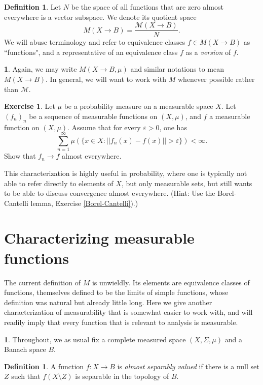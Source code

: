 \documentclass[12pt]{book}
\newcommand{\dfn}[1]{\emph{#1}\index{#1}}
\theoremstyle{definition}
\newtheorem{subsec}[theorem]{}
\newtheorem{definition}[theorem]{Definition}
\newtheorem{exercise}[theorem]{Exercise}
\begin{document}
\begin{definition}
Let $N$ be the space of all functions that are zero almost everywhere is a vector subspace. We denote its quotient space
$$M(X \to B) = \frac{\mathcal M(X \to B)}{N}.$$
We will abuse terminology and refer to equivalence classes $f \in M(X \to B)$ as ``functions", and a representative of an equivalence class $f$ as a \dfn{version} of $f$.
\end{definition}

\begin{subsec}
Again, we may write $M(X \to B, \mu)$ and similar notations to mean $M(X \to B)$.
In general, we will want to work with $M$ whenever possible rather than $\mathcal M$.
\end{subsec}

\begin{exercise}
Let $\mu$ be a probability measure on a measurable space $X$.
Let $(f_n)_n$ be a sequence of measurable functions on $(X, \mu)$, and $f$ a measurable function on $(X, \mu)$.
Assume that for every $\varepsilon > 0$, one has
$$\sum_{n=1}^\infty \mu(\{x \in X: ||f_n(x) - f(x)|| > \varepsilon\}) < \infty.$$
Show that $f_n \to f$ almost everywhere.

This characterization is highly useful in probability, where one is typically not able to refer directly to elements of $X$, but only measurable sets, but still wants to be able to discuss convergence almost everywhere.
(Hint: Use the Borel-Cantelli lemma, Exercise \ref{Borel-Cantelli}).)
\end{exercise}



\section{Characterizing measurable functions}
The current definition of $M$ is unwieldly. Its elements are equivalence classes of functions, themselves defined to be the limits of simple functions, whose definition was natural but already little long.
Here we give another characterization of measurability that is somewhat easier to work with, and will readily imply that every function that is relevant to analysis is measurable.

\begin{subsec}
Throughout, we as usual fix a complete measured space $(X, \Sigma, \mu)$ and a Banach space $B$.
\end{subsec}

\begin{definition}
\label{almost separably valued dfn}
A function $f: X \to B$ is \dfn{almost separably valued} if there is a null set $Z$ such that $f(X \setminus Z)$ is separable in the topology of $B$.
\end{definition}
\end{document}
